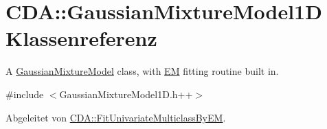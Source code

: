 \hypertarget{classCDA_1_1GaussianMixtureModel1D}{
\section{CDA::GaussianMixtureModel1D Klassenreferenz}
\label{classCDA_1_1GaussianMixtureModel1D}
}


A \hyperlink{classCDA_1_1GaussianMixtureModel}{GaussianMixtureModel} class, with \hyperlink{classCDA_1_1EM}{EM} fitting routine built in.  




{\ttfamily \#include $<$GaussianMixtureModel1D.h++$>$}



Abgeleitet von \hyperlink{classCDA_1_1FitUnivariateMulticlassByEM}{CDA::FitUnivariateMulticlassByEM}.



